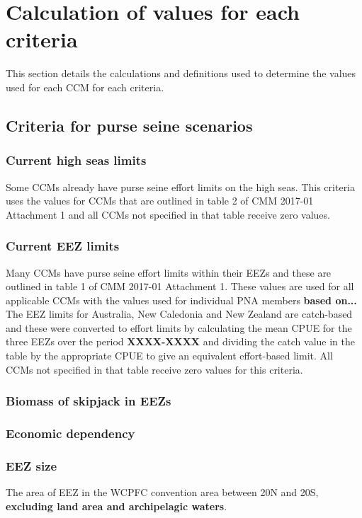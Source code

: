 \documentclass[11pt]{article}
\begin{document}
\section{Calculation of values for each criteria} \label{sec:scendet}
This section details the calculations and definitions used to determine the values used for each CCM for each criteria. 

\subsection{Criteria for purse seine scenarios}

\subsubsection*{Current high seas limits}
Some CCMs already have purse seine effort limits on the high seas. This criteria uses the values for CCMs that are outlined in table 2 of CMM 2017-01 Attachment 1 and all CCMs not specified in that table receive zero values.

\subsubsection*{Current EEZ limits}
Many CCMs have purse seine effort limits within their EEZs and these are outlined in table 1 of CMM 2017-01 Attachment 1. These values are used for all applicable CCMs with the values used for individual PNA members {\bf based on...} The EEZ limits for Australia, New Caledonia and New Zealand are catch-based and these were converted to effort limits by calculating the mean CPUE for the three EEZs over the period {\bf XXXX-XXXX} and dividing the catch value in the table by the appropriate CPUE to give an equivalent effort-based limit. All CCMs not specified in that table receive zero values for this criteria.

\subsubsection*{Biomass of skipjack in EEZs}

\subsubsection*{Economic dependency}

\subsubsection*{EEZ size}
The area of EEZ in the WCPFC convention area between 20\degree N and 20\degree S, {\bf excluding land area and archipelagic waters}.
\end{document}
